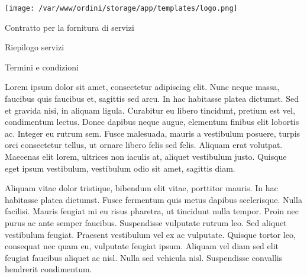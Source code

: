 \documentclass{article}
\begin{document}
\begin{center}
\texttt{[image: /var/www/ordini/storage/app/templates/logo.png]}

\vspace{3cm}
{\huge Contratto per la fornitura di servizi} 
\end{center}

\begin{center}
\newpage
\end{center}


\begin{center}
\end{center}

\newpage

{\huge Riepilogo servizi}

\vspace{0.5cm}
\begin{itemize}
\end{itemize}
\vspace{0.5cm}
\newpage
{\huge Termini e condizioni}

\vspace{0.5cm}
Lorem ipsum dolor sit amet, consectetur adipiscing elit. Nunc neque massa, faucibus quis faucibus et, sagittis sed arcu. In hac habitasse platea dictumst. Sed et gravida nisi, in aliquam ligula. Curabitur eu libero tincidunt, pretium est vel, condimentum lectus. Donec dapibus neque augue, elementum finibus elit lobortis ac. Integer eu rutrum sem. Fusce malesuada, mauris a vestibulum posuere, turpis orci consectetur tellus, ut ornare libero felis sed felis. Aliquam erat volutpat. Maecenas elit lorem, ultrices non iaculis at, aliquet vestibulum justo. Quisque eget ipsum vestibulum, vestibulum odio sit amet, sagittis diam.


Aliquam vitae dolor tristique, bibendum elit vitae, porttitor mauris. In hac habitasse platea dictumst. Fusce fermentum quis metus dapibus scelerisque. Nulla facilisi. Mauris feugiat mi eu risus pharetra, ut tincidunt nulla tempor. Proin nec purus ac ante semper faucibus. Suspendisse vulputate rutrum leo. Sed aliquet vestibulum feugiat. Praesent vestibulum vel ex ac vulputate. Quisque tortor leo, consequat nec quam eu, vulputate feugiat ipsum. Aliquam vel diam sed elit feugiat faucibus aliquet ac nisl. Nulla sed vehicula nisl. Suspendisse convallis hendrerit condimentum.
\end{document}
